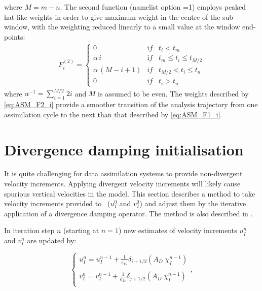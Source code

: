\documentclass[../main/NEMO_manual]{subfiles}
\begin{document}
where $M = m-n$.
The second function (namelist option =1) employs peaked hat-like weights in order to give maximum weight in the centre of the sub-window,
with the weighting reduced linearly to a small value at the window end-points:
\begin{align}
  \label{eq:ASM_F2_i}
  F^{(2)}_{i}
  =\left\{
  \begin{array}{ll}
    0                           &    {\mathrm if} \; \; \; t_{i}       <     t_{m}                        \\
    \alpha \, i               &    {\mathrm if} \; \; \; t_{m}    \leq t_{i}    \leq   t_{M/2}   \\
    \alpha \, (M - i +1) &    {\mathrm if} \; \; \; t_{M/2}  <    t_{i}    \leq   t_{n}       \\
    0                            &   {\mathrm if} \; \; \; t_{i}        >    t_{n}
  \end{array}
                                   \right.
\end{align}
where $\alpha^{-1} = \sum_{i=1}^{M/2} 2i$ and $M$ is assumed to be even.
The weights described by \autoref{eq:ASM_F2_i} provide a smoother transition of the analysis trajectory from
one assimilation cycle to the next than that described by \autoref{eq:ASM_F1_i}.

\section{Divergence damping initialisation}
\label{sec:ASM_div_dmp}

It is quite challenging for data assimilation systems to provide non-divergent velocity increments.
Applying divergent velocity increments will likely cause spurious vertical velocities in the model. This section describes a method to take velocity increments provided to \NEMO\ ($u^0_I$ and $v^0_I$) and adjust them by the iterative application of a divergence damping operator. The method is also described in \citet{dobricic.pinardi.ea_OS07}.

In iteration step $n$ (starting at $n=1$) new estimates of velocity increments $u^{n}_I$ and $v^{n}_I$ are updated by:

\begin{equation}
  \label{eq:ASM_dmp}
  \left\{
    \begin{aligned}
      u^{n}_I = u^{n-1}_I + \frac{1}{e_{1u} } \delta_{i+1/2} \left( {A_D
          \;\chi^{n-1}_I } \right) \\ \\
      v^{n}_I = v^{n-1}_I + \frac{1}{e_{2v} } \delta_{j+1/2} \left( {A_D
          \;\chi^{n-1}_I } \right) \\
    \end{aligned}
  \right.,
\end{equation}
\end{document}
